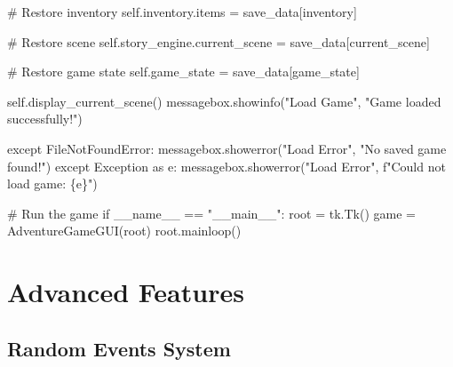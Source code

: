 \documentclass[
  letterpaper,
  DIV=11,
  numbers=noendperiod,
  oneside]{scrreprt}
\newenvironment{Shaded}{}{}
\newcommand{\CommentTok}[1]{\textcolor[rgb]{0.42,0.45,0.49}{#1}}
\newcommand{\ControlFlowTok}[1]{\textcolor[rgb]{0.84,0.23,0.29}{#1}}
\newcommand{\ImportTok}[1]{\textcolor[rgb]{0.01,0.18,0.38}{#1}}
\newcommand{\NormalTok}[1]{\textcolor[rgb]{0.14,0.16,0.18}{#1}}
\newcommand{\OperatorTok}[1]{\textcolor[rgb]{0.14,0.16,0.18}{#1}}
\newcommand{\PreprocessorTok}[1]{\textcolor[rgb]{0.84,0.23,0.29}{#1}}
\newcommand{\SpecialCharTok}[1]{\textcolor[rgb]{0.00,0.36,0.77}{#1}}
\newcommand{\SpecialStringTok}[1]{\textcolor[rgb]{0.01,0.18,0.38}{#1}}
\newcommand{\StringTok}[1]{\textcolor[rgb]{0.01,0.18,0.38}{#1}}
\newcommand{\VariableTok}[1]{\textcolor[rgb]{0.89,0.38,0.04}{#1}}
\begin{document}
\begin{Shaded}
\begin{Highlighting}[]
            \CommentTok{\# Restore inventory}
            \VariableTok{self}\NormalTok{.inventory.items }\OperatorTok{=}\NormalTok{ save\_data[}\StringTok{\textquotesingle{}inventory\textquotesingle{}}\NormalTok{]}
            
            \CommentTok{\# Restore scene}
            \VariableTok{self}\NormalTok{.story\_engine.current\_scene }\OperatorTok{=}\NormalTok{ save\_data[}\StringTok{\textquotesingle{}current\_scene\textquotesingle{}}\NormalTok{]}
            
            \CommentTok{\# Restore game state}
            \VariableTok{self}\NormalTok{.game\_state }\OperatorTok{=}\NormalTok{ save\_data[}\StringTok{\textquotesingle{}game\_state\textquotesingle{}}\NormalTok{]}
            
            \VariableTok{self}\NormalTok{.display\_current\_scene()}
\NormalTok{            messagebox.showinfo(}\StringTok{"Load Game"}\NormalTok{, }\StringTok{"Game loaded successfully!"}\NormalTok{)}
            
        \ControlFlowTok{except} \PreprocessorTok{FileNotFoundError}\NormalTok{:}
\NormalTok{            messagebox.showerror(}\StringTok{"Load Error"}\NormalTok{, }\StringTok{"No saved game found!"}\NormalTok{)}
        \ControlFlowTok{except} \PreprocessorTok{Exception} \ImportTok{as}\NormalTok{ e:}
\NormalTok{            messagebox.showerror(}\StringTok{"Load Error"}\NormalTok{, }\SpecialStringTok{f"Could not load game: }\SpecialCharTok{\{}\NormalTok{e}\SpecialCharTok{\}}\SpecialStringTok{"}\NormalTok{)}

\CommentTok{\# Run the game}
\ControlFlowTok{if} \VariableTok{\_\_name\_\_} \OperatorTok{==} \StringTok{"\_\_main\_\_"}\NormalTok{:}
\NormalTok{    root }\OperatorTok{=}\NormalTok{ tk.Tk()}
\NormalTok{    game }\OperatorTok{=}\NormalTok{ AdventureGameGUI(root)}
\NormalTok{    root.mainloop()}
\end{Highlighting}
\end{Shaded}

\section{Advanced Features}\label{advanced-features-2}

\subsection{Random Events System}\label{random-events-system}
\end{document}

